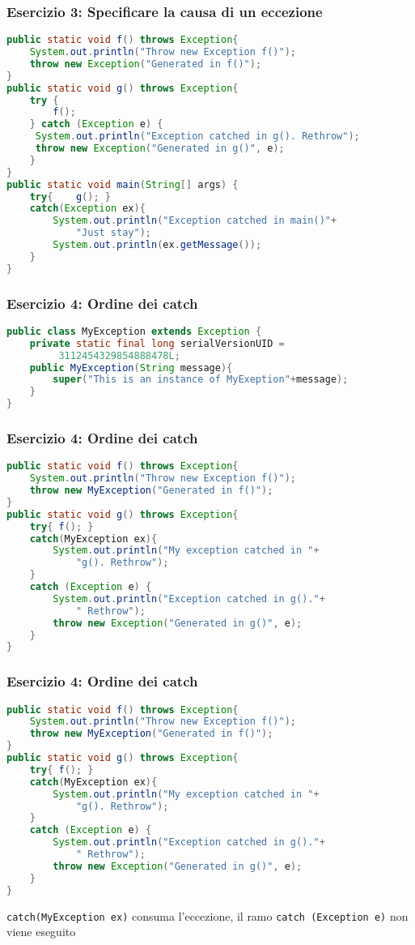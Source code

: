 \documentclass{beamer}
\begin{document}
\begin{frame}[fragile]
\frametitle{Esercizio 3: Specificare la causa di un eccezione}

\begin{lstlisting}[language=Java]
public static void f() throws Exception{
    System.out.println("Throw new Exception f()");
    throw new Exception("Generated in f()");
}
public static void g() throws Exception{
    try {
        f();
    } catch (Exception e) {
     System.out.println("Exception catched in g(). Rethrow");
     throw new Exception("Generated in g()", e);
    }
}
public static void main(String[] args) {
    try{    g(); }
    catch(Exception ex){
        System.out.println("Exception catched in main()"+
            "Just stay");
        System.out.println(ex.getMessage());
    }
}
\end{lstlisting}
\end{frame}

\begin{frame}[fragile]
\frametitle{Esercizio 4: Ordine dei catch}

\begin{lstlisting}[language=Java]
public class MyException extends Exception {
    private static final long serialVersionUID =
         3112454329854888478L;
    public MyException(String message){
        super("This is an instance of MyExeption"+message);
    }
}
\end{lstlisting}
\end{frame}

\begin{frame}[fragile]
\frametitle{Esercizio 4: Ordine dei catch}
\begin{lstlisting}[language=Java]
public static void f() throws Exception{
    System.out.println("Throw new Exception f()");
    throw new MyException("Generated in f()");
}
public static void g() throws Exception{
    try{ f(); }
    catch(MyException ex){
        System.out.println("My exception catched in "+
            "g(). Rethrow");
    }
    catch (Exception e) {
        System.out.println("Exception catched in g()."+
            " Rethrow");
        throw new Exception("Generated in g()", e);
    }
}
\end{lstlisting}
\end{frame}


\begin{frame}[fragile]
\frametitle{Esercizio 4: Ordine dei catch}
\begin{lstlisting}[language=Java]
public static void f() throws Exception{
    System.out.println("Throw new Exception f()");
    throw new MyException("Generated in f()");
}
public static void g() throws Exception{
    try{ f(); }
    catch(MyException ex){
        System.out.println("My exception catched in "+
            "g(). Rethrow");
    }
    catch (Exception e) {
        System.out.println("Exception catched in g()."+
            " Rethrow");
        throw new Exception("Generated in g()", e);
    }
}
\end{lstlisting}
\texttt{catch(MyException ex)} consuma l'eccezione, il ramo \texttt{catch (Exception e)} non viene eseguito
\end{frame}
\end{document}
